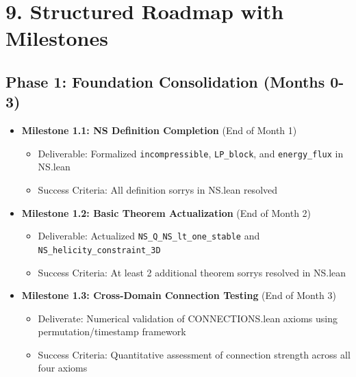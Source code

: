\documentclass[11pt]{article}
\begin{document}
\section{9. Structured Roadmap with Milestones}

\subsection{Phase 1: Foundation Consolidation (Months 0-3)}
\begin{itemize}
\item \textbf{Milestone 1.1: NS Definition Completion} (End of Month 1)
  \begin{itemize}
  \item Deliverable: Formalized \texttt{incompressible}, \texttt{LP\_block}, and \texttt{energy\_flux} in NS.lean
  \item Success Criteria: All definition sorrys in NS.lean resolved
  \end{itemize}
\item \textbf{Milestone 1.2: Basic Theorem Actualization} (End of Month 2)
  \begin{itemize}
  \item Deliverable: Actualized \texttt{NS\_Q\_NS\_lt\_one\_stable} and \texttt{NS\_helicity\_constraint\_3D}
  \item Success Criteria: At least 2 additional theorem sorrys resolved in NS.lean
  \end{itemize}
\item \textbf{Milestone 1.3: Cross-Domain Connection Testing} (End of Month 3)
  \begin{itemize}
  \item Deliverate: Numerical validation of CONNECTIONS.lean axioms using permutation/timestamp framework
  \item Success Criteria: Quantitative assessment of connection strength across all four axioms
  \end{itemize}
\end{itemize}
\end{document}
